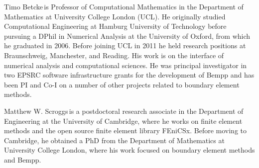 \documentclass{IEEEcsmag}
\begin{document}
\begin{IEEEbiography}{Timo Betcke}{\,}is Professor of Computational Mathematics in the Department of Mathematics at University College London (UCL).
He originally studied Computational Engineering at Hamburg University of Technology before pursuing a DPhil in Numerical Analysis
at the University of Oxford, from which he graduated in 2006. Before joining UCL in 2011 he held research positions at Braunschweig,
Manchester, and Reading. His work is on the interface of numerical analysis and computational sciences. He was principal investigator
in two EPSRC software infrastructure grants for the development of Bempp and has been PI and Co-I on a number of other projects related
to boundary element methods.
\end{IEEEbiography}

\begin{IEEEbiography}{Matthew W. Scroggs}{\,}is a postdoctoral research associate in the Department of Engineering at the
University of Cambridge, where he works on finite element methods and the open source finite element library FEniCSx.
Before moving to Cambridge, he obtained a PhD from the Department of Mathematics at University College London, where his
work focused on boundary element methods and Bempp.
\end{IEEEbiography}
\end{document}
